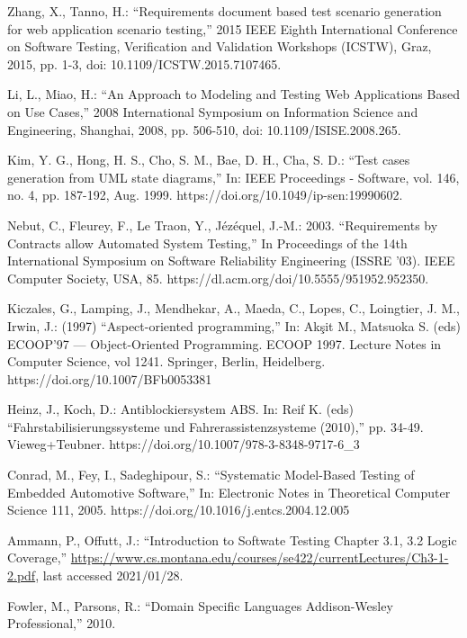 \documentclass[a4paper,10pt, bibliography=totocnumbered]{scrreprt}
\begin{document}
\begin{thebibliography}{9}
 Zhang, X., Tanno, H.: \enquote{Requirements document based test scenario generation for web application scenario testing,} 2015 IEEE Eighth International Conference on Software Testing, Verification and Validation Workshops (ICSTW), Graz, 2015, pp. 1-3, doi: 10.1109/ICSTW.2015.7107465.

 Li, L., Miao, H.: \enquote{An Approach to Modeling and Testing Web Applications Based on Use Cases,} 2008 International Symposium on Information Science and Engineering, Shanghai, 2008, pp. 506-510, doi: 10.1109/ISISE.2008.265.

 Kim, Y. G., Hong, H. S., Cho, S. M., Bae, D. H., Cha, S. D.: \enquote{Test cases generation from UML state diagrams,}
In: IEEE Proceedings - Software, vol. 146, no. 4, pp. 187-192, Aug. 1999.
https://doi.org/10.1049/ip-sen:19990602.

 Nebut, C., Fleurey, F., Le Traon, Y., Jézéquel, J.-M.: 2003. \enquote{Requirements by Contracts allow Automated System Testing,} In Proceedings of the 14th International Symposium on Software Reliability Engineering (ISSRE '03). IEEE Computer Society, USA, 85.
https://dl.acm.org/doi/10.5555/951952.952350.


 Kiczales, G., Lamping, J., Mendhekar, A., Maeda, C., Lopes, C., Loingtier, J. M., Irwin, J.: (1997) \enquote{Aspect-oriented programming,} In: Akşit M., Matsuoka S. (eds) ECOOP'97 — Object-Oriented Programming. ECOOP 1997. Lecture Notes in Computer Science, vol 1241. Springer, Berlin, Heidelberg.
https://doi.org/10.1007/BFb0053381

 Heinz, J., Koch, D.: Antiblockiersystem ABS.
In: Reif K. (eds) \enquote{Fahrstabilisierungssysteme und Fahrerassistenzsysteme (2010),} pp. 34-49. Vieweg+Teubner. 
https://doi.org/10.1007/978-3-8348-9717-6\_3

 Conrad, M., Fey, I., Sadeghipour, S.: \enquote{Systematic Model-Based Testing of Embedded Automotive Software,} 
In: Electronic Notes in Theoretical Computer Science 111, 2005.
https://doi.org/10.1016/j.entcs.2004.12.005

 Ammann, P., Offutt, J.: \enquote{Introduction to Softwate Testing Chapter 3.1, 3.2 Logic Coverage,} \url{https://www.cs.montana.edu/courses/se422/currentLectures/Ch3-1-2.pdf}, last accessed 2021/01/28.

 Fowler, M., Parsons, R.: \enquote{Domain Specific Languages
Addison-Wesley Professional,} 2010.


\end{thebibliography}
\end{document}

